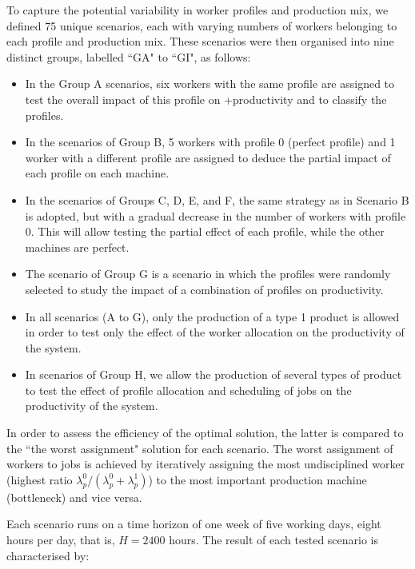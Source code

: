 \documentclass[review,12pt, 3p, times]{elsarticle}
\begin{document}
To capture the potential variability in worker profiles and production mix, we defined 75 unique scenarios, each with varying numbers of workers belonging to each profile and production mix. These scenarios were then organised into nine distinct groups, labelled “GA" to “GI", as follows:
\begin{itemize}
	\item In the Group A scenarios, six workers with the same profile are assigned to test the overall impact of this profile on
	      +productivity and to classify the profiles. 
	\item In the scenarios of Group B, 5 workers with profile 0 (perfect profile) and 1 worker with a different profile are assigned to deduce the partial impact of each profile on each machine.
	\item In the scenarios of Groups C, D, E, and F, the same strategy as in Scenario B is adopted, but with a gradual decrease in the number of workers with profile 0. This will allow testing the partial effect of each profile, while the other machines are perfect. 
	\item The scenario of Group G is a scenario in which the profiles were randomly selected to study the impact of a combination of profiles on productivity.
	\item  In all scenarios (A to G), only the production of a type 1 product is allowed in order to test only the effect of the worker allocation on the productivity of the system.
	\item In scenarios of Group H, we allow the production of several types of product to test the effect of profile allocation and scheduling of jobs on the productivity of the system.  
\end{itemize}
					
In order to assess the efficiency of the optimal solution, the latter is compared to the “the worst assignment" solution for each scenario. The worst assignment of workers to jobs is achieved by iteratively assigning the most undisciplined worker (highest ratio $\lambda^0_p/(\lambda^0_p+\lambda^1_p)$) to the most important production machine (bottleneck) and vice versa.
					
Each scenario runs on a time horizon of one week of five working days, eight hours per day, that is, $H=2400$ hours. The result of each tested scenario is characterised by:
	
\end{document}
